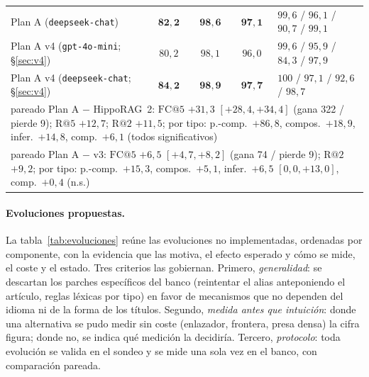 \documentclass[11pt,a4paper]{article}
\newcommand{\hippo}{HippoRAG~2}
\begin{document}
\begin{table}[p]
\begin{tabular}{lcccp{}}
Plan A (\texttt{deepseek-chat}) & $\mathbf{82{,}2}$ & $\mathbf{98{,}6}$ & $\mathbf{97{,}1}$ & $99{,}6$ / $96{,}1$ / $90{,}7$ / $99{,}1$\\
Plan A v4 (\texttt{gpt-4o-mini}; \S\ref{sec:v4}) & $80{,}2$ & $98{,}1$ & $96{,}0$ & $99{,}6$ / $95{,}9$ / $84{,}3$ / $97{,}9$\\
Plan A v4 (\texttt{deepseek-chat}; \S\ref{sec:v4}) & $\mathbf{84{,}2}$ & $\mathbf{98{,}9}$ & $\mathbf{97{,}7}$ & $100$ / $97{,}1$ / $92{,}6$ / $98{,}7$\\
\multicolumn{5}{p{0.93\textwidth}}{pareado Plan A $-$ \hippo{}: $\mathrm{FC@}5$ $+31{,}3$ $[+28{,}4,+34{,}4]$ (gana 322 / pierde 9); $\mathrm{R@}5$ $+12{,}7$; $\mathrm{R@}2$ $+11{,}5$; por tipo: p.-comp.\ $+86{,}8$, compos.\ $+18{,}9$, infer.\ $+14{,}8$, comp.\ $+6{,}1$ (todos significativos)}\\
\multicolumn{5}{p{0.93\textwidth}}{pareado Plan A $-$ v3: $\mathrm{FC@}5$ $+6{,}5$ $[+4{,}7,+8{,}2]$ (gana 74 / pierde 9); $\mathrm{R@}2$ $+9{,}2$; por tipo: p.-comp.\ $+15{,}3$, compos.\ $+5{,}1$, infer.\ $+6{,}5$ $[0{,}0,+13{,}0]$, comp.\ $+0{,}4$ (n.s.)}\\
\bottomrule
\end{tabular}
\end{table}

\paragraph{Evoluciones propuestas.}
La tabla~\ref{tab:evoluciones} reúne las evoluciones no implementadas,
ordenadas por componente, con la evidencia que las motiva, el efecto
esperado y cómo se mide, el coste y el estado. Tres criterios las
gobiernan. Primero, \emph{generalidad}: se descartan los parches
específicos del banco (reintentar el alias anteponiendo el artículo,
reglas léxicas por tipo) en favor de mecanismos que no dependen del
idioma ni de la forma de los títulos. Segundo, \emph{medida antes que
intuición}: donde una alternativa se pudo medir sin coste (enlazador,
frontera, presa densa) la cifra figura; donde no, se indica qué medición
la decidiría. Tercero, \emph{protocolo}: toda evolución se valida en el
sondeo y se mide una sola vez en el banco, con comparación pareada.
\end{document}
